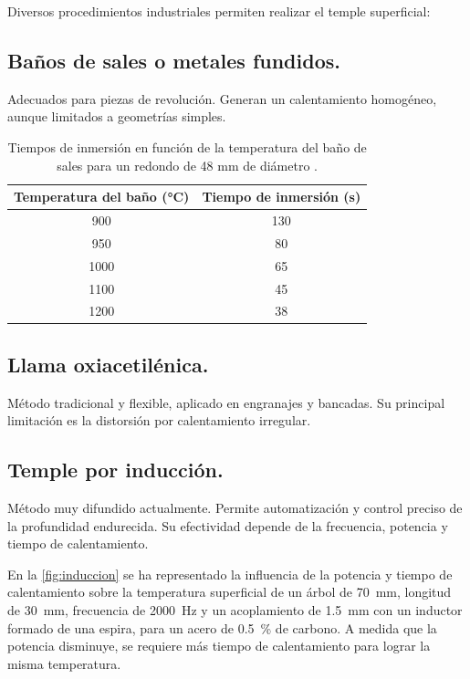 \documentclass[12pt,a4paper]{article}
\begin{document}
Diversos procedimientos industriales permiten realizar el temple superficial:

\subsection{Baños de sales o metales fundidos.}

Adecuados para piezas de revolución. Generan un calentamiento homogéneo, aunque limitados a geometrías simples.

\begin{table}[h]
    \centering
    \begin{tabular}{cc}
        \toprule
        Temperatura del baño (\si{\celsius}) & Tiempo de inmersión (\si{\second}) \\
        \midrule
        900  & 130 \\
        950  & 80  \\
        1000 & 65  \\
        1100 & 45  \\
        1200 & 38  \\
        \bottomrule
    \end{tabular}
    \caption{Tiempos de inmersión en función de la temperatura del baño de sales para un redondo de 48 mm de diámetro \cite{sturla}.}
\end{table}

\subsection{Llama oxiacetilénica.}

Método tradicional y flexible, aplicado en engranajes y bancadas. Su principal limitación es la distorsión por calentamiento irregular.

\subsection{Temple por inducción.}

Método muy difundido actualmente. Permite automatización y control preciso de la profundidad endurecida. Su efectividad depende de la frecuencia, potencia y tiempo de calentamiento.

En la \cref{fig:induccion} se ha representado la influencia de la potencia y tiempo de calentamiento sobre la temperatura superficial de un árbol de \SI{70}{\milli\metre}\diameter, longitud de \SI{30}{\milli\metre}, frecuencia de \SI{2000}{\hertz} y un acoplamiento de \SI{1,5}{\milli\metre} con un inductor formado de una espira, para un acero de \SI{0,5}{\percent} de carbono. A medida que la potencia disminuye, se requiere más tiempo de calentamiento para lograr la misma temperatura.
\end{document}
